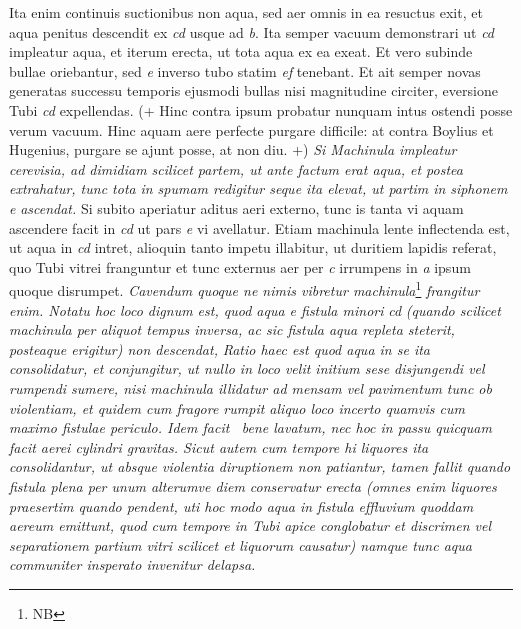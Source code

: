                      Ita enim  continuis suctionibus non aqua, sed aer omnis in  ea resuctus exit, et aqua penitus descendit ex \textit{cd}  usque ad  \textit{b}. Ita semper vacuum demonstrari  ut \textit{cd} impleatur aqua,  et iterum erecta, ut tota aqua ex ea exeat. Et  vero subinde bullae oriebantur, sed \textit{e} inverso tubo  statim  \textit{ef} tenebant. Et ait semper  novas generatas successu temporis ejusmodi bullas  nisi magnitudine circiter, eversione Tubi \textit{cd} expellendas. (+ Hinc contra ipsum probatur nunquam intus  ostendi posse verum vacuum. Hinc aquam aere perfecte  purgare difficile: at contra Boylius\protect{} et Hugenius\protect{}, purgare se  ajunt posse, at non diu. +) \textit{Si Machinula  impleatur cerevisia, ad dimidiam scilicet partem, ut ante  factum erat aqua, et postea extrahatur, tunc tota }\textit{  in spumam redigitur seque ita elevat, ut partim in }\textit{siphonem}\protect{}\textit{ }\textit{e}\textit{ ascendat.} Si subito aperiatur aditus aeri externo, tunc  is tanta vi aquam ascendere facit in \textit{cd} ut pars \textit{e}  vi avellatur. Etiam machinula lente inflectenda est,  ut aqua in \textit{cd} intret, alioquin tanto impetu illabitur, ut duritiem lapidis referat, quo Tubi vitrei franguntur  et tunc externus aer per \textit{c} irrumpens in \textit{a} ipsum  quoque disrumpet. \textit{Cavendum quoque ne nimis vibretur machinula}\footnote{NB}\textit{  frangitur enim. Notatu hoc loco dignum est, quod aqua  e fistula minori }\textit{cd}\textit{ (quando scilicet machinula per aliquot  tempus inversa, ac sic fistula aqua repleta steterit, posteaque  erigitur) non descendat, }\textit{}\textit{ Ratio haec est quod aqua in se ita consolidatur, et  conjungitur, ut nullo in loco velit initium sese disjungendi  vel rumpendi sumere, nisi machinula illidatur ad mensam  vel pavimentum tunc ob violentiam, et quidem cum fragore rumpit aliquo loco incerto quamvis cum maximo fistulae periculo. Idem facit \mercury \, bene lavatum, nec hoc in passu  quicquam facit aerei cylindri gravitas. Sicut autem cum  tempore hi liquores ita consolidantur, ut absque violentia diruptionem non patiantur, tamen fallit quando fistula plena per unum  alterumve diem conservatur erecta (omnes enim liquores praesertim quando pendent, uti hoc modo aqua in fistula effluvium  quoddam aereum emittunt, quod cum tempore in Tubi apice conglobatur et discrimen vel separationem partium vitri scilicet  et liquorum causatur) namque tunc aqua communiter insperato invenitur delapsa.}
                     \pend 